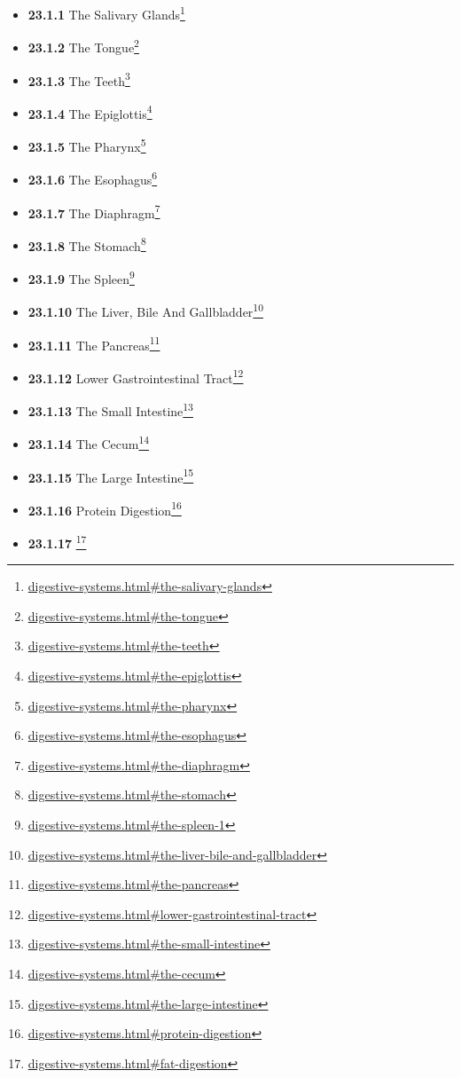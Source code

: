 \documentclass[
]{article}
\providecommand{\tightlist}{%
  \setlength{\itemsep}{0pt}\setlength{\parskip}{0pt}}
\providecommand{\tightlist}{%
  \setlength{\itemsep}{0pt}\setlength{\parskip}{0pt}}
\let\rmarkdownfootnote\footnote%
\def\footnote{\protect\rmarkdownfootnote}
\renewcommand{\href}[2]{#2\footnote{\url{#1}}}
\theoremstyle{definition}
\theoremstyle{definition}
\theoremstyle{definition}
\theoremstyle{remark}
\begin{document}
\begin{itemize}
\begin{itemize}
    \begin{itemize}
    \tightlist
    \item
      \href{digestive-systems.html\#the-salivary-glands}{\emph{}\textbf{23.1.1}
      The Salivary Glands}
    \item
      \href{digestive-systems.html\#the-tongue}{\emph{}\textbf{23.1.2}
      The Tongue}
    \item
      \href{digestive-systems.html\#the-teeth}{\emph{}\textbf{23.1.3}
      The Teeth}
    \item
      \href{digestive-systems.html\#the-epiglottis}{\emph{}\textbf{23.1.4}
      The Epiglottis}
    \item
      \href{digestive-systems.html\#the-pharynx}{\emph{}\textbf{23.1.5}
      The Pharynx}
    \item
      \href{digestive-systems.html\#the-esophagus}{\emph{}\textbf{23.1.6}
      The Esophagus}
    \item
      \href{digestive-systems.html\#the-diaphragm}{\emph{}\textbf{23.1.7}
      The Diaphragm}
    \item
      \href{digestive-systems.html\#the-stomach}{\emph{}\textbf{23.1.8}
      The Stomach}
    \item
      \href{digestive-systems.html\#the-spleen-1}{\emph{}\textbf{23.1.9}
      The Spleen}
    \item
      \href{digestive-systems.html\#the-liver-bile-and-gallbladder}{\emph{}\textbf{23.1.10}
      The Liver, Bile And Gallbladder}
    \item
      \href{digestive-systems.html\#the-pancreas}{\emph{}\textbf{23.1.11}
      The Pancreas}
    \item
      \href{digestive-systems.html\#lower-gastrointestinal-tract}{\emph{}\textbf{23.1.12}
      Lower Gastrointestinal Tract}
    \item
      \href{digestive-systems.html\#the-small-intestine}{\emph{}\textbf{23.1.13}
      The Small Intestine}
    \item
      \href{digestive-systems.html\#the-cecum}{\emph{}\textbf{23.1.14}
      The Cecum}
    \item
      \href{digestive-systems.html\#the-large-intestine}{\emph{}\textbf{23.1.15}
      The Large Intestine}
    \item
      \href{digestive-systems.html\#protein-digestion}{\emph{}\textbf{23.1.16}
      Protein Digestion}
    \item
      \href{digestive-systems.html\#fat-digestion}{\emph{}\textbf{23.1.17}
}
\end{itemize}
\end{itemize}
\end{itemize}
\end{document}
